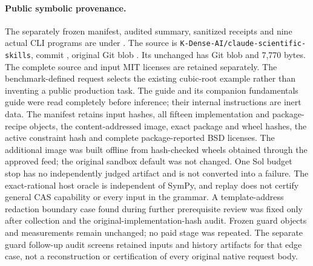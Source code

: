 \documentclass{article}
\theoremstyle{plain}
\theoremstyle{definition}
\newcommand{\id}[1]{\texttt{#1}}
\begin{document}
\paragraph{Public symbolic provenance.}
The separately frozen manifest, audited summary, sanitized receipts and nine
actual CLI programs are under
.
The source is \id{K-Dense-AI/claude-scientific-skills}, commit
, original Git blob
.
Its unchanged  has Git blob
 and 7,770 bytes.
The complete source and input MIT licenses are retained separately. The
benchmark-defined request selects the existing cubic-root example rather than
inventing a public production task. The guide and its companion fundamentals
guide were read completely before inference; their internal instructions are
inert data. The manifest retains input hashes, all fifteen implementation and
package-recipe objects, the content-addressed image, exact package and wheel
hashes, the active constraint hash and complete package-reported BSD licenses.
The additional image was built offline from hash-checked wheels obtained
through the approved feed; the original sandbox default was not changed.
One Sol budget stop has no independently judged artifact and is not converted
into a failure. The exact-rational host oracle is independent of SymPy, and
replay does not certify general CAS capability or every input in the grammar.
A template-address redaction boundary case found during further prerequisite
review was fixed only after collection and the original-implementation-hash
audit. Frozen guard objects and measurements remain unchanged; no paid stage
was repeated. The separate guard follow-up audit screens retained inputs and
history artifacts for that edge case, not a reconstruction or certification
of every original native request body.
\end{document}
